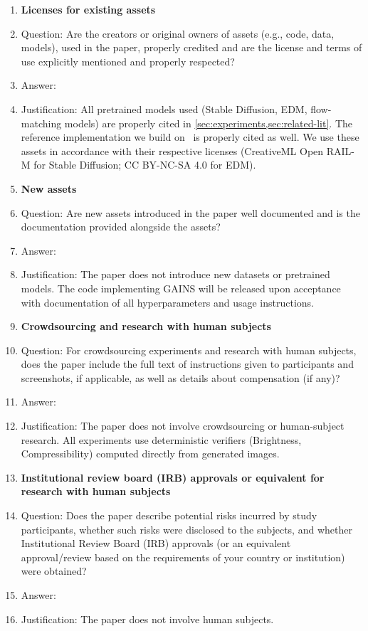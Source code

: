 \begin{enumerate}
\item {\bf Licenses for existing assets}
\item[] Question: Are the creators or original owners of assets (e.g., code, data, models), used in the paper, properly credited and are the license and terms of use explicitly mentioned and properly respected?
\item[] Answer: \answerYes{}
\item[] Justification: All pretrained models used (Stable Diffusion, EDM, flow-matching models) are properly cited in \cref{sec:experiments,sec:related-lit}. The reference implementation we build on~\citep{ramesh2025nts} is properly cited as well. We use these assets in accordance with their respective licenses (CreativeML Open RAIL-M for Stable Diffusion; CC BY-NC-SA 4.0 for EDM).

\item {\bf New assets}
\item[] Question: Are new assets introduced in the paper well documented and is the documentation provided alongside the assets?
\item[] Answer: \answerNA{}
\item[] Justification: The paper does not introduce new datasets or pretrained models. The code implementing \textsc{GAINS} will be released upon acceptance with documentation of all hyperparameters and usage instructions.

\item {\bf Crowdsourcing and research with human subjects}
\item[] Question: For crowdsourcing experiments and research with human subjects, does the paper include the full text of instructions given to participants and screenshots, if applicable, as well as details about compensation (if any)?
\item[] Answer: \answerNA{}
\item[] Justification: The paper does not involve crowdsourcing or human-subject research. All experiments use deterministic verifiers (Brightness, Compressibility) computed directly from generated images.

\item {\bf Institutional review board (IRB) approvals or equivalent for research with human subjects}
\item[] Question: Does the paper describe potential risks incurred by study participants, whether such risks were disclosed to the subjects, and whether Institutional Review Board (IRB) approvals (or an equivalent approval/review based on the requirements of your country or institution) were obtained?
\item[] Answer: \answerNA{}
\item[] Justification: The paper does not involve human subjects.


\end{enumerate}
